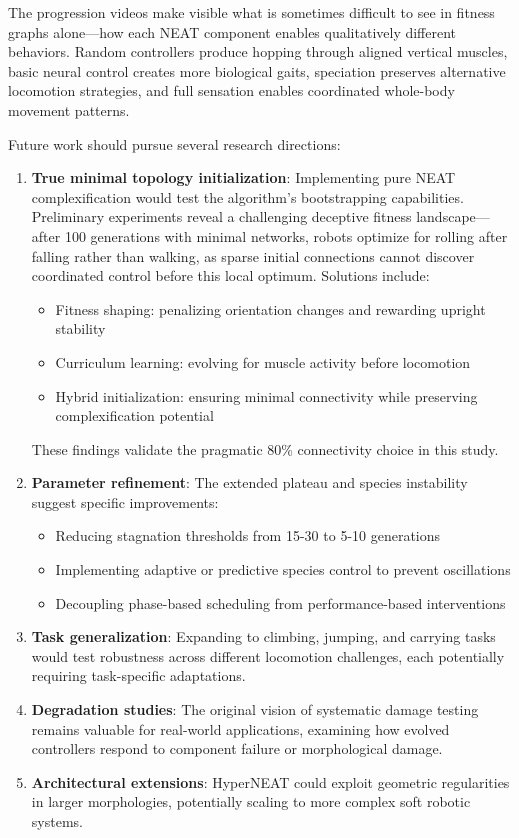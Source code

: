 \documentclass[conference]{IEEEtran}
\begin{document}
The progression videos make visible what is sometimes difficult to see in fitness graphs alone—how each NEAT component enables qualitatively different behaviors. Random controllers produce hopping through aligned vertical muscles, basic neural control creates more biological gaits, speciation preserves alternative locomotion strategies, and full sensation enables coordinated whole-body movement patterns.

Future work should pursue several research directions:

\begin{enumerate}
\item \textbf{True minimal topology initialization}: Implementing pure NEAT complexification would test the algorithm's bootstrapping capabilities. Preliminary experiments reveal a challenging deceptive fitness landscape—after 100 generations with minimal networks, robots optimize for rolling after falling rather than walking, as sparse initial connections cannot discover coordinated control before this local optimum. Solutions include:
\begin{itemize}
    \item Fitness shaping: penalizing orientation changes and rewarding upright stability
    \item Curriculum learning: evolving for muscle activity before locomotion
    \item Hybrid initialization: ensuring minimal connectivity while preserving complexification potential
\end{itemize}
These findings validate the pragmatic 80\% connectivity choice in this study.

\item \textbf{Parameter refinement}: The extended plateau and species instability suggest specific improvements:
\begin{itemize}
    \item Reducing stagnation thresholds from 15-30 to 5-10 generations
    \item Implementing adaptive or predictive species control to prevent oscillations
    \item Decoupling phase-based scheduling from performance-based interventions
\end{itemize}

\item \textbf{Task generalization}: Expanding to climbing, jumping, and carrying tasks would test robustness across different locomotion challenges, each potentially requiring task-specific adaptations.

\item \textbf{Degradation studies}: The original vision of systematic damage testing remains valuable for real-world applications, examining how evolved controllers respond to component failure or morphological damage.

\item \textbf{Architectural extensions}: HyperNEAT could exploit geometric regularities in larger morphologies, potentially scaling to more complex soft robotic systems.
\end{enumerate}
\end{document}
